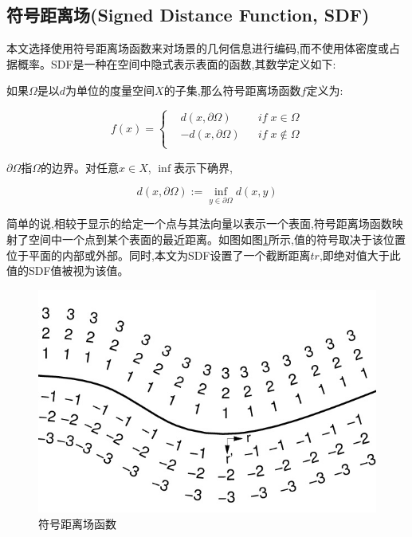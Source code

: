 \subsection{符号距离场(Signed Distance Function, SDF)}
本文选择使用符号距离场函数\cite{sdf}来对场景的几何信息进行编码,而不使用体密度或占据概率。SDF是一种在空间中隐式表示表面的函数,其数学定义如下:

如果$\Omega$是以$d$为单位的度量空间$X$的子集,那么符号距离场函数$f$定义为:

$$f(x) = \left\{
\begin{aligned}
&d(x,\partial\Omega)&&if\; x\in\Omega \\
&-d(x,\partial\Omega)&&if\; x\notin\Omega\\
\end{aligned}
\right.
$$

$\partial\Omega$指$\Omega$的边界。对任意$x\in X$, $\inf$表示下确界,

$$
d(x,\partial\Omega) := \inf_{y\in \partial\Omega}d(x,y)
$$

简单的说,相较于显示的给定一个点与其法向量以表示一个表面,符号距离场函数映射了空间中一个点到某个表面的最近距离。如图如图\ref{sdf_figure}所示,值的符号取决于该位置位于平面的内部或外部。同时,本文为SDF设置了一个截断距离$tr$,即绝对值大于此值的SDF值被视为该值。
\begin{figure}[htbp]
    \centering
    \includegraphics[scale=0.3]{figures/sdf_figure.jpeg}
    \caption{符号距离场函数}\label{sdf_figure}
\end{figure}

